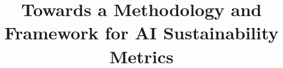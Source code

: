 \documentclass[sigconf]{acmart}
\begin{document}

\title{Towards a Methodology and Framework for AI Sustainability Metrics} %








\end{document}
